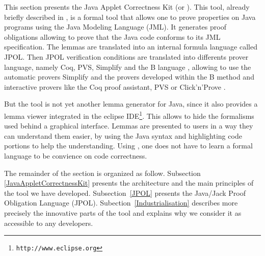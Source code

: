   This section presents the Java Applet Correctness Kit
 (or \JACK).  This tool, already briefly described in
 \cite{BR-gdc2002,BRL-JACK}, is a formal tool that allows one to prove properties on
 Java programs using the Java Modeling Language \cite{Leavens-Baker-Ruby03} (JML).
 It generates proof obligations
 allowing to prove that the Java code conforms to its JML
 specification.  The lemmas are translated into an internal formula language called JPOL. Then JPOL verification conditions are translated into differents prover language, namely Coq, PVS, Simplify and the B language \cite{bbook},
 allowing to use the automatic provers Simplify and the provers developed within the B method and interactive provers like the Coq proof assistant, PVS or Click'n'Prove .

 But the tool is not yet another lemma generator for Java, since it also provides a lemma
 viewer integrated in the eclipse
 IDE\footnote{\texttt{http://www.eclipse.org}}.  This allows to
 hide the formalisms used behind a graphical interface.  Lemmas are
 presented to users in a way they can understand them easier, by using the Java syntax and highlighting code portions to help
 the understanding. Using \JACK, one does not have to learn a formal language to be convience on
code correctness.

 The remainder of the section is organized as follow.  Subsection \ref{JavaAppletCorrectnessKit} presents the
 architecture and the main principles of the tool we have
 developed.
Subsection~\ref{JPOL} presents the Java/Jack Proof Obligation Language (JPOL).
Subection~\ref{Industrialisation} describes more precisely
 the innovative parts of the tool and explains why we consider it as
 accessible to any developers.

